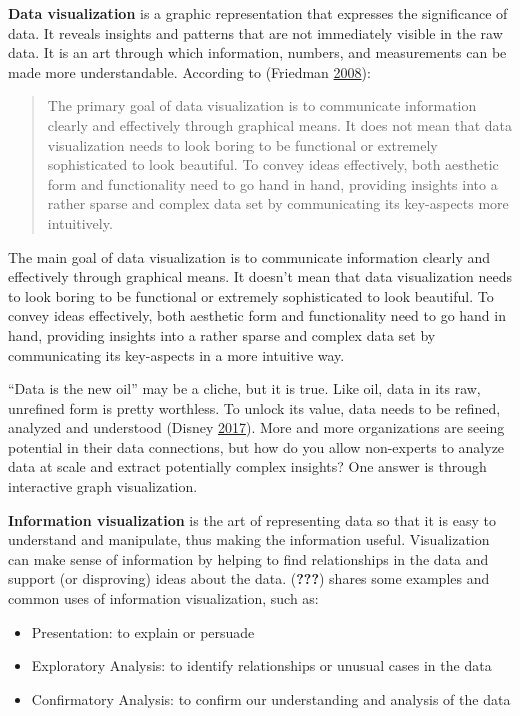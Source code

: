 \documentclass[]{book}
\providecommand{\tightlist}{%
  \setlength{\itemsep}{0pt}\setlength{\parskip}{0pt}}
\theoremstyle{definition}
\theoremstyle{definition}
\theoremstyle{definition}
\theoremstyle{remark}
\begin{document}
\textbf{Data visualization} is a graphic representation that expresses
the significance of data. It reveals insights and patterns that are not
immediately visible in the raw data. It is an art through which
information, numbers, and measurements can be made more understandable.
According to (Friedman \protect\hyperlink{ref-viz}{2008}):

\begin{quote}
The primary goal of data visualization is to communicate information
clearly and effectively through graphical means. It does not mean that
data visualization needs to look boring to be functional or extremely
sophisticated to look beautiful. To convey ideas effectively, both
aesthetic form and functionality need to go hand in hand, providing
insights into a rather sparse and complex data set by communicating its
key-aspects more intuitively.
\end{quote}

The main goal of data visualization is to communicate information
clearly and effectively through graphical means. It doesn't mean that
data visualization needs to look boring to be functional or extremely
sophisticated to look beautiful. To convey ideas effectively, both
aesthetic form and functionality need to go hand in hand, providing
insights into a rather sparse and complex data set by communicating its
key-aspects in a more intuitive way.

``Data is the new oil'' may be a cliche, but it is true. Like oil, data
in its raw, unrefined form is pretty worthless. To unlock its value,
data needs to be refined, analyzed and understood (Disney
\protect\hyperlink{ref-lawfraud}{2017}). More and more organizations are
seeing potential in their data connections, but how do you allow
non-experts to analyze data at scale and extract potentially complex
insights? One answer is through interactive graph visualization.

\textbf{Information visualization} is the art of representing data so
that it is easy to understand and manipulate, thus making the
information useful. Visualization can make sense of information by
helping to find relationships in the data and support (or disproving)
ideas about the data. ({\textbf{???}}) shares some examples and common
uses of information visualization, such as:

\begin{itemize}
\tightlist
\item
  Presentation: to explain or persuade
\item
  Exploratory Analysis: to identify relationships or unusual cases in
  the data
\item
  Confirmatory Analysis: to confirm our understanding and analysis of
  the data
\end{itemize}
\end{document}

